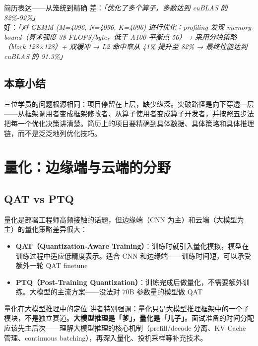 \documentclass[a4paper]{article}
\begin{document}
\begin{knowledgebox}{简历表达——从笼统到精确}
差：\emph{「优化了多个算子，多数达到 cuBLAS 的 82\%-92\%」} \\
好：\emph{「对 GEMM (M=4096, N=4096, K=4096) 进行优化：profiling 发现 memory-bound（算术强度 38 FLOPS/byte，低于 A100 平衡点 56）→ 采用分块策略（block 128×128）+ 双缓冲 → L2 命中率从 41\% 提升至 82\% → 最终性能达到 cuBLAS 的 91.3\%」}
\end{knowledgebox}

\subsection{本章小结}
三位学员的问题根源相同：项目停留在上层，缺少纵深。突破路径是向下穿透一层——从框架调用者变成框架修改者、从算子使用者变成算子开发者，并按照五步法把每一个优化决策讲清楚。简历上的项目要精确到具体数据、具体策略和具体推理链，而不是泛泛地列优化技巧。

\section{量化：边缘端与云端的分野}

\subsection{QAT vs PTQ}

量化是部署工程师高频接触的话题，但边缘端（CNN 为主）和云端（大模型为主）的量化策略差异很大：

\begin{itemize}
    \item \textbf{QAT（Quantization-Aware Training）}：训练时就引入量化模拟，模型在训练过程中适应低精度表示。适合 CNN 和边缘端——训练时间短，可以承受额外一轮 QAT finetune
    \item \textbf{PTQ（Post-Training Quantization）}：训练完成后做量化，不需要额外训练。大模型的主流方案——没法对 70B 参数量的模型做 QAT
\end{itemize}

\begin{importantbox}{量化在大模型推理中的定位}
讲者特别强调：量化只是大模型推理框架中的一个子模块，不是独立赛道。\textbf{大模型推理是「爹」，量化是「儿子」}。面试准备的时间分配应该先主后次——理解大模型推理的核心机制（prefill/decode 分离、KV Cache 管理、continuous batching），再深入量化、投机采样等补充技术。
\end{importantbox}
\end{document}
